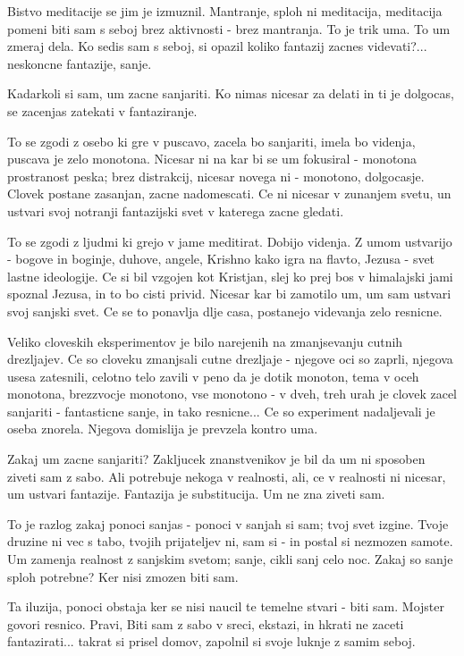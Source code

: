Bistvo meditacije se jim je izmuznil. Mantranje, sploh ni meditacija, meditacija pomeni biti sam s seboj brez aktivnosti - brez mantranja. To je trik uma. To um zmeraj dela. Ko sedis sam s seboj, si opazil koliko fantazij zacnes videvati?... neskoncne fantazije, sanje. 

Kadarkoli si sam, um zacne sanjariti. Ko nimas nicesar za delati in ti je dolgocas, se zacenjas zatekati v fantaziranje. 

To se zgodi z osebo ki gre v puscavo, zacela bo sanjariti, imela bo videnja, puscava je zelo monotona. Nicesar ni na kar bi se um fokusiral - monotona prostranost peska; brez distrakcij, nicesar novega ni - monotono, dolgocasje. Clovek postane zasanjan, zacne nadomescati. Ce ni nicesar v zunanjem svetu, un ustvari svoj notranji fantazijski svet v katerega zacne gledati. 

To se zgodi z ljudmi ki grejo v jame meditirat. Dobijo videnja. Z umom ustvarijo - bogove in boginje, duhove, angele, Krishno kako igra na flavto, Jezusa - svet lastne ideologije. Ce si bil vzgojen kot Kristjan, slej ko prej bos v himalajski jami spoznal Jezusa, in to bo cisti privid. Nicesar kar bi zamotilo um, um sam ustvari svoj sanjski svet. Ce se to ponavlja dlje casa, postanejo videvanja zelo resnicne. 

Veliko cloveskih eksperimentov je bilo narejenih na zmanjsevanju cutnih drezljajev. Ce so cloveku zmanjsali cutne drezljaje - njegove oci so zaprli, njegova usesa zatesnili, celotno telo zavili v peno da je dotik monoton, tema v oceh monotona, brezzvocje monotono, vse monotono - v dveh, treh urah je clovek zacel sanjariti - fantasticne sanje, in tako resnicne...  Ce so experiment nadaljevali je oseba znorela. Njegova domislija je prevzela kontro uma. 

Zakaj um zacne sanjariti? Zakljucek znanstvenikov je bil da um ni sposoben ziveti sam z sabo. Ali potrebuje nekoga v realnosti, ali, ce v realnosti ni nicesar, um ustvari fantazije. Fantazija je substitucija. Um ne zna ziveti sam. 

To je razlog zakaj ponoci sanjas - ponoci v sanjah si sam; tvoj svet izgine. Tvoje druzine ni vec s tabo, tvojih prijateljev ni, sam si - in postal si nezmozen samote. Um zamenja realnost z sanjskim svetom; sanje, cikli sanj celo noc. Zakaj so sanje sploh potrebne? Ker nisi zmozen biti sam. 

Ta iluzija, ponoci obstaja ker se nisi naucil te temelne stvari - biti sam. Mojster govori resnico. Pravi,  Biti sam z sabo v sreci, ekstazi, in hkrati ne zaceti fantazirati... takrat si prisel domov, zapolnil si svoje luknje z samim seboj. 

